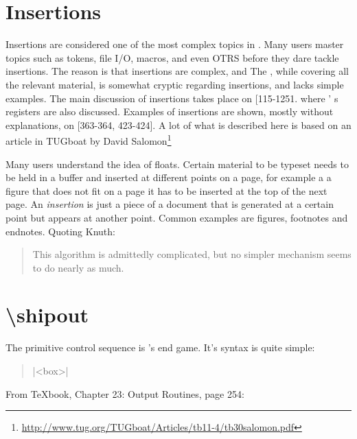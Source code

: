 \section{Insertions}
Insertions are considered one of  the most  complex  topics in \tex. Many users master  topics  such 
as tokens,  file  I/O, macros,  and  even  OTRS  before they dare  tackle  insertions.  The  reason  is  that 
insertions  are  complex,  and  The \texbook, while 
covering all the relevant material, is somewhat cryptic regarding  insertions, and  lacks  simple examples. 
The  main  discussion  of  insertions takes  place  on 
[115-1251.  where \tex' s  registers  are also discussed. 
Examples  of  insertions are  shown, mostly  without 
explanations,  on  [363-364,  423-424].  A lot of what is described here is based on an article in TUGboat by David Salomon\footnote{\protect\url{http://www.tug.org/TUGboat/Articles/tb11-4/tb30salomon.pdf}}

Many users understand the idea of floats. Certain material to be typeset needs to be held in a buffer and inserted at different points on a page, for example a a figure that does not fit on a page it has to be inserted at the top of the next page. An \textit{insertion} is just a piece of a document that is generated at a certain point but appears at another point. Common examples are figures, footnotes and endnotes. Quoting Knuth:

\begin{quote}
  This  algorithm  is  admittedly  complicated, 
but  no  simpler  mechanism  seems  to  do  nearly 
as  much.
\end{quote}

\section{\protect\textbackslash shipout}

The primitive control sequence  is \tex's end game. It's syntax is quite simple:

\begin{quote}
|\shipout<box>|
\end{quote}

From TeXbook, Chapter 23: Output Routines, page 254:

